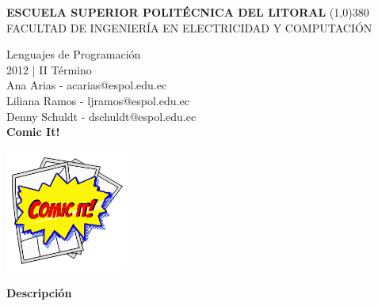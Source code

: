 \documentclass[12pt]{report}
\begin{document}
	\setlength{\topmargin}{-0.5in}
	\pagestyle{empty}
	\begin{center}
		\textbf{
			\vspace{-0.7em}
			ESCUELA SUPERIOR POLITÉCNICA DEL LITORAL
		}
		\line(1,0){380}\\		
		\scriptsize{FACULTAD DE INGENIERÍA EN ELECTRICIDAD Y COMPUTACIÓN}
	\end{center}
	\begin{center}
		\vspace{2.5em}
		Lenguajes de Programación
		\\2012 | II Término
		\vspace{1.5em}
		\\Ana Arias - acarias@espol.edu.ec
		\vspace{4mm}
		\\Liliana Ramos - ljramos@espol.edu.ec
		\\Denny Schuldt - dschuldt@espol.edu.ec
		\vspace{2em}
		\Huge{\textbf{\\Comic It!	\vspace{1em}}}
	\end{center}	

\begin{center}
		\begingroup
			\includegraphics[width=0.30\textwidth]{imagenes_usuario/comicit.jpg}
		\endgroup
	\end{center}


	\begingroup
		\large{
			\textbf{
				Descripción
				\newline
				\newline
			}
		}
	\endgroup
\end{document}
